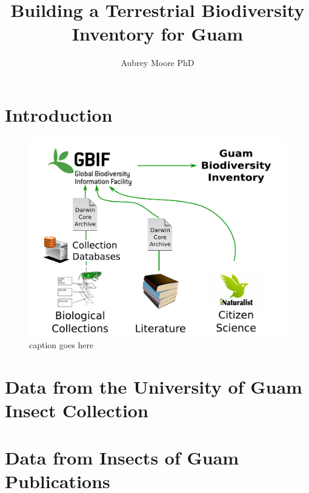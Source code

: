 \documentclass[12pt,letterpaper,english,bibliography=totocnumbered, abstract=on]{scrartcl}
\begin{document}
\titlehead{Final Report: McIntire-Stennis Project XXXX}

\title{Building a Terrestrial Biodiversity Inventory for Guam}

\author{Aubrey Moore PhD}

\maketitle
\newpage
\tableofcontents

\pagebreak

\section{Introduction}

\begin{figure}
	\includegraphics[width=\linewidth]{images/diag1}
	\caption{caption goes here}
	\label{fig:diag1}
\end{figure}

\section{Data from the University of Guam Insect Collection}

\section{Data from Insects of Guam Publications}
\end{document}
